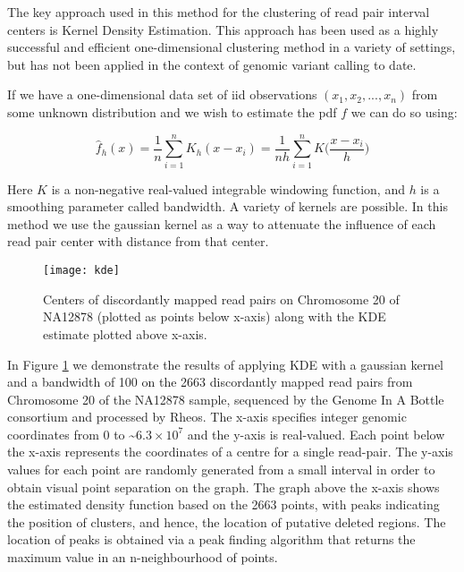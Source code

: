  The key approach used in this method for the clustering of read pair interval centers is Kernel Density Estimation. This approach has been used as a highly successful and efficient one-dimensional clustering method in a variety of settings\autocites{hartigan1975clustering}{kriegel2011density}{cuevas2001cluster}, but has not been applied in the context of genomic variant calling to date. 

 If we have a one-dimensional data set of iid observations $(x_1, x_2, ..., x_n)$ from some unknown distribution and we wish to estimate the pdf $f$ we can do so using:  

 \begin{equation}
    \widehat{f}_h(x) = \frac{1}{n}\sum_{i=1}^n K_h (x - x_i) = \frac{1}{nh} \sum_{i=1}^n K\Big(\frac{x-x_i}{h}\Big) 
 \end{equation}
 
 Here $K$ is a non-negative real-valued integrable windowing function, and $h$ is a smoothing parameter called bandwidth. A variety of kernels are possible. In this method we use the gaussian kernel as a way to attenuate the influence of each read pair center with distance from that center.

 \begin{figure}[H]
    \texttt{[image: kde]}
    \centering
    \caption {Centers of discordantly mapped read pairs on Chromosome 20 of NA12878 (plotted as points below x-axis) along with the KDE estimate plotted above x-axis.}
    \label{fig:kde}
\end{figure}

In Figure \ref{fig:kde} we demonstrate the results of applying KDE with a gaussian kernel and a bandwidth of 100 on the 2663 discordantly mapped read pairs from Chromosome 20 of the NA12878 sample, sequenced by the Genome In A Bottle\autocite{zook2018reproducible} consortium and processed by Rheos. The x-axis specifies integer genomic coordinates from 0 to \~$6.3\times10^7$ and the y-axis is real-valued. Each point below the x-axis represents the coordinates of a centre for a single read-pair. The y-axis values for each point are randomly generated from a small interval in order to obtain visual point separation on the graph. The graph above the x-axis shows the estimated density function based on the 2663 points, with peaks indicating the position of clusters, and hence, the location of putative deleted regions. The location of peaks is obtained via a peak finding algorithm that returns the maximum value in an n-neighbourhood of points.

